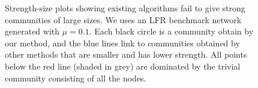 \begin{figure}[t]
    \centering
    \def\svgwidth{\columnwidth}
    \fontsize{10}{10}\selectfont
    
    \hfill
    \vspace{-.5em}
    \caption{Strength-size plots showing existing algorithms fail to give strong communities of large sizes. We uses an LFR benchmark network~\cite{lancichinetti2009benchmarks} generated with $\mu=0.1$. Each black circle is a community obtain by our method, and the blue lines link to communities obtained by other methods that are smaller and has lower strength. All points below the red line (shaded in grey) are dominated by the trivial community consisting of all the nodes.}

  \label{fig:LFR}
\end{figure}


